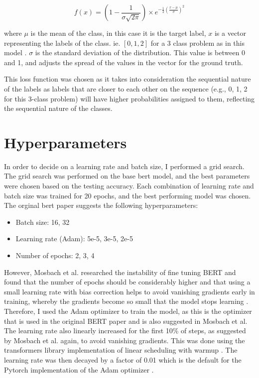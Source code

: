\documentclass{UoYCSproject}
\begin{document}
    \[f(x) = (1-\frac{1}{\sigma \sqrt {2\pi}}) \times e ^{-\frac{1}{2}(\frac{x-\mu }{\sigma})^{2}}\]

    where $\mu$ is the mean of the class, in this case it is the target label, $x$ is a vector representing the labels of the class. ie. $[0,1,2]$ for a 3 class problem as in this model .
    $\sigma$ is the standard deviation of the distribution.
    This value is between 0 and 1, and adjusts the spread of the values in the vector for the ground truth.

    This loss function was chosen as it takes into consideration the sequential nature of the labels as labels that are closer to each other on the sequence (e.g., 0, 1, 2 for this 3-class problem) will have higher probabilities assigned to them, reflecting the sequential nature of the classes.

    \section{Hyperparameters}\label{sec:hyperparameters}
    In order to decide on a learning rate and batch size, I performed a grid search.
    The grid search was performed on the base bert model, and the best parameters were chosen based on the testing accuracy.
    Each combination of learning rate and batch size was trained for 20 epochs, and the best performing model was chosen.
    The orginal bert paper suggests the following hyperparameters:
    \begin{itemize}
        \item Batch size: 16, 32
        \item Learning rate (Adam): 5e-5, 3e-5, 2e-5
        \item Number of epochs: 2, 3, 4
    \end{itemize}

    However, Mosbach et al. researched the instability of fine tuning BERT and found that the number of epochs should be considerably higher and that using a small learning rate with bias correction helps to avoid vanishing gradients early in training, whereby the gradients become so small that the model stops learning \cite{mosbach2021stability}.
    Therefore, I used the Adam optimizer to train the model, as this is the optimizer that is used in the original BERT paper and is also suggested in Mosbach et al.
    The learning rate also linearly increased for the first 10\% of steps, as suggested by Mosbach et al. again, to avoid vanishing gradients.
    This was done using the transformers library implementation of linear scheduling with warmup \cite{transformerLinearSchedular}.
    The learning rate was then decayed by a factor of 0.01 which is the default for the Pytorch implementation of the Adam optimizer \cite{adamPytorch}.
\end{document}
